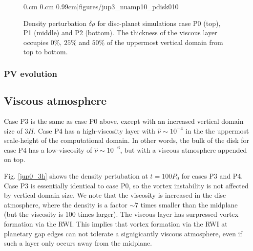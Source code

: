 \begin{figure}
     0.cm 0.cm
     0.99cm]{figures/jup3_nuamp10_pdisk010}\\%
   \caption{Density perturbation $\delta\rho$ for disc-planet
     simulations case P0 (top), P1 (middle) and P2 (bottom). The
     thickness of the viscous layer occupies $0\%,\,25\%$ and $50\%$
     of the uppermost vertical domain from top to bottom. 
   \label{jup0}}
 \end{figure}


\subsubsection{PV evolution}





\subsection{Viscous atmosphere}
Case P3 is the same as case P0 above, except with an increased
vertical domain size of $3H$. Case P4 has a high-viscosity layer with
$\hat{\nu}\sim10^{-4}$ in the the uppermost scale-height of the
computational domain. In other words, the bulk of the 
disk for case P4 has a low-viscosity of $\hat{\nu}\sim10^{-6}$, but
with a viscous atmosphere appended on top.  

Fig. \ref{jup0_3h} shows the density pertubation at $t=100P_0$ for
cases P3 and P4. Case P3 is essentially identical to case P0, so the
vortex instability is not affected by vertical domain size. We note
that the viscosity is increased in the disc atmosphere, where the
density is a factor $\sim 7$ times smaller than the midplane (but the
viscosity is $100$ times larger). The viscous layer has surpressed
vortex formation via the RWI. This implies that vortex formation via
the RWI at planetary gap edges can not tolerate a signigicantly
viscous atmosphere, even if such a layer only occurs away from the
midplane.    

